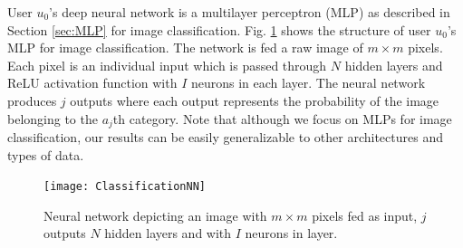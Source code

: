 \documentclass[conference]{IEEEtran}
\begin{document}
User $u_0$'s deep neural network is a multilayer perceptron (MLP) as described in Section \ref{sec:MLP} for image classification.
Fig. \ref{fig:ClassNN} shows the structure of user $u_0$'s MLP for image classification. The network is fed a raw image of  $m
\times m$ pixels. Each pixel is an individual input which is passed through $N$ hidden layers and ReLU activation function with $I$
neurons in each layer. The neural network produces $j$ outputs where each output represents the probability of the image belonging to
the $a_j$th category. Note that although we focus on MLPs for image classification, our results can be easily generalizable to other
architectures and types of data. 
\begin{figure}[!h]
\texttt{[image: ClassificationNN]}
\caption{Neural network depicting an image with $m \times m$ pixels fed as input, $j$ outputs  $N$  hidden layers and with $I$ neurons in layer.}
\label{fig:ClassNN}
\end{figure}
\end{document}

